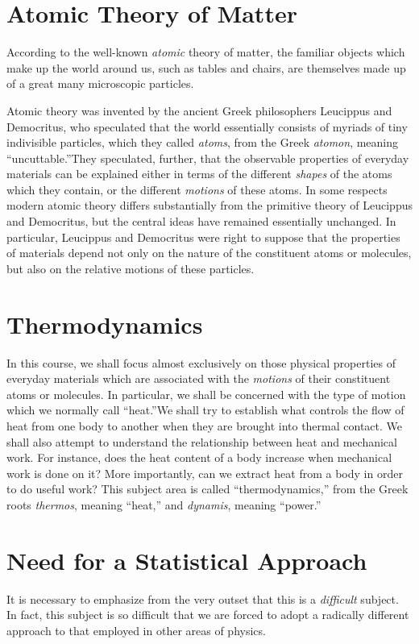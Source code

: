 \section{Atomic Theory of Matter}
According to the well-known 
{\em atomic} theory of matter, the familiar objects which 
make up the world around us, such as tables and chairs,
 are themselves made up of a great many 
microscopic particles.

Atomic theory was invented by the ancient Greek philosophers Leucippus
and Democritus, who speculated that the world  essentially consists of
myriads of tiny indivisible particles, which they called {\em atoms}, from the
Greek {\em atomon}, meaning ``uncuttable.''\@ They speculated, further, that
the observable properties of everyday 
materials can be explained either in terms of 
 the
different {\em shapes}\/ of the atoms  which they contain, or the
different {\em motions}\/ of these atoms.
In some respects modern atomic theory differs substantially from the
primitive theory of Leucippus and Democritus, but the central ideas
have remained essentially unchanged. 
In particular, Leucippus and Democritus were right
to suppose that the properties of  materials depend not only
on the nature of the constituent atoms or molecules, 
but also on the relative motions of these particles.

\section{Thermodynamics}
In this  course, we shall focus almost exclusively 
 on those physical properties of everyday materials which are
associated with the {\em motions} of their
constituent atoms or molecules. In particular, we shall be
concerned with the type of motion which we normally
call ``heat.''\@ We shall try to
establish what controls the flow of heat from one body to another
when they are brought into thermal contact. We shall also
attempt to understand the relationship between heat and mechanical work.
For instance, does the heat content of a body  increase when mechanical
work is done on it? More importantly,  can we extract heat from
a body in order to do useful work? This subject area is called
``thermodynamics,'' from the Greek roots {\em thermos}, meaning ``heat,'' and
{\em dynamis}, meaning ``power.''

\section{Need for a Statistical Approach}
It is necessary to emphasize from the 
very outset that this is a {\em difficult}\/
 subject. In fact,
this subject is so difficult that we are forced to adopt a radically different 
approach  to that employed in 
other areas of physics.

